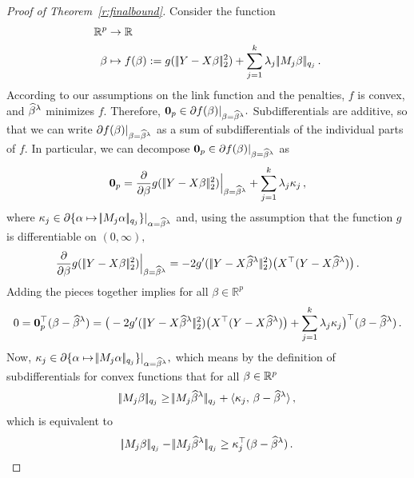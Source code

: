 \documentclass[bj]{imsart}
\newcommand{\normtwo}[1]{\ensuremath{\!|\!| #1 | \! |_{2}}}
\newcommand{\normqj}[1]{\ensuremath{\!|\!| #1 | \! |_{q_j}}}
\newcommand{\inprod}[2]{\ensuremath{\langle #1 , \, #2 \rangle}}
\newcommand{\1}{{\rm 1}\mskip -4,5mu{\rm l} }
\def\R{\mathbb{R}}
\newcommand{\genbeta}{\textcolor{black}{\beta}}
\begin{document}
\label{page:argument}
\begin{proof}[Proof of Theorem~\ref{r:finalbound}]%
Consider the function
\begin{align*}
\R^p&\to \R\\
\beta&\mapsto f(\beta):=g(\,\normtwo{\outcome-\design\beta}^2)+\sum_{j=1}^{\numbergroups}\lambda_j\,\normqj{\fusedmatrix_j\beta}\,.
\end{align*}
According to our assumptions on the link function and the penalties, $f$ is convex, and $\widehat \beta^{\lambda}$ minimizes $f.$  
Therefore, ${\bf 0}_p\in\partial f(\beta)|_{\beta=\widehat \beta^{\lambda}}.$ 
Subdifferentials are additive, so that we can write $\partial f(\beta)|_{\beta=\widehat \beta^{\lambda}}$ as a sum of subdifferentials of the individual parts of $f.$ In particular, we can decompose ${\bf 0}_p\in\partial f(\beta)|_{\beta=\widehat \beta^{\lambda}}$ as 
\begin{equation*}
  {\bf 0}_p= \frac{\partial}{\partial \beta}g(\,\normtwo{\outcome-\design\beta}^2)\Big|_{\beta=\estimatort}+\sum_{j=1}^\numbergroups\tuningparameter_j\kappa_j\,,
\end{equation*}
where $\kappa_j\in\partial\{\alpha\mapsto \normqj{M_{j}\alpha}\}|_{\alpha=\estimatort}$ and, using the assumption that the function $g$ is differentiable on $(0,\infty),$
\begin{equation*}
 \frac{\partial}{\partial \beta}g(\,\normtwo{\outcome-\design\beta}^2)\Big|_{\beta=\estimatort}=-2 g'(\,\normtwo{\outcome-\design\estimatort}^2)\big(\design^{\top}(\outcome-\design\estimatort)\big)\,.
\end{equation*}
Adding the pieces together implies for all $\beta\in\R^p$
\begin{equation*}
  0={\bf 0}_p^\top(\genbeta-\estimatort)=\big(-2 g'(\,\normtwo{\outcome-\design\estimatort}^2)\big(\design^{\top}(\outcome-\design\estimatort)\big)+\sum_{j=1}^\numbergroups\tuningparameter_j\kappa_j\big)^\top(\genbeta-\estimatort)\,.
\end{equation*}
Now, $\kappa_j\in\partial\{\alpha\mapsto \normqj{M_{j}\alpha}\}|_{\alpha=\estimatort},$ which means by the definition of subdifferentials for convex functions that  for all $\genbeta\in \R^p$
\begin{equation*}
\normqj{\fusedmatrix_{j}\genbeta}\ge \normqj{\fusedmatrix_{j}\estimatort}+\inprod{\kappa_j}{\genbeta-\estimatort}\,,
\end{equation*}
which is equivalent to
\begin{align*}
\normqj{\fusedmatrix_j\genbeta}-\normqj{\fusedmatrix_j\estimatort}\ge \kappa_j^\top (\genbeta-\estimatort)\,.

\end{align*}
\end{proof}
\end{document}
